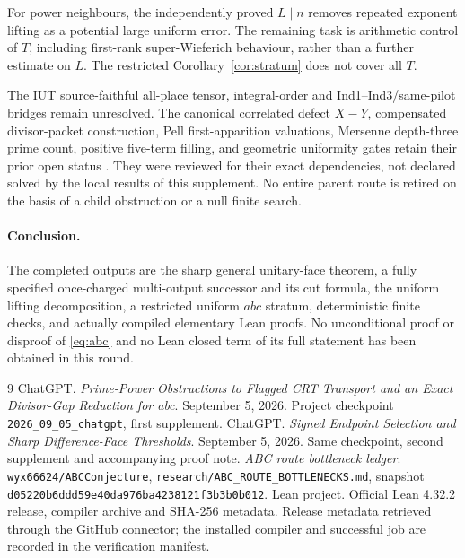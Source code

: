 \documentclass[11pt]{article}
\theoremstyle{definition}\newtheorem{definition}[theorem]{Definition}
\theoremstyle{remark}\newtheorem{remark}[theorem]{Remark}
\newcommand{\code}[1]{\texttt{\small #1}}
\begin{document}
For power neighbours, the independently proved \(L\mid n\) removes repeated exponent lifting as a potential large uniform error. The remaining task is arithmetic control of \(T\), including first-rank super-Wieferich behaviour, rather than a further estimate on \(L\). The restricted Corollary~\ref{cor:stratum} does not cover all \(T\).

The IUT source-faithful all-place tensor, integral-order and Ind1--Ind3/same-pilot bridges remain unresolved. The canonical correlated defect \(X-Y\), compensated divisor-packet construction, Pell first-apparition valuations, Mersenne depth-three prime count, positive five-term filling, and geometric uniformity gates retain their prior open status \cite{ledger}. They were reviewed for their exact dependencies, not declared solved by the local results of this supplement. No entire parent route is retired on the basis of a child obstruction or a null finite search.

\paragraph{Conclusion.}
The completed outputs are the sharp general unitary-face theorem, a fully specified once-charged multi-output successor and its cut formula, the uniform lifting decomposition, a restricted uniform \(abc\) stratum, deterministic finite checks, and actually compiled elementary Lean proofs. No unconditional proof or disproof of \eqref{eq:abc} and no Lean closed term of its full statement has been obtained in this round.

\begin{thebibliography}{9}
 ChatGPT. \emph{Prime-Power Obstructions to Flagged CRT Transport and an Exact Divisor-Gap Reduction for abc}. September 5, 2026. Project checkpoint \code{2026\_09\_05\_chatgpt}, first supplement.
 ChatGPT. \emph{Signed Endpoint Selection and Sharp Difference-Face Thresholds}. September 5, 2026. Same checkpoint, second supplement and accompanying proof note.
 \emph{ABC route bottleneck ledger}. \code{wyx66624/ABCConjecture}, \code{research/ABC\_ROUTE\_BOTTLENECKS.md}, snapshot \code{d05220b6ddd59e40da976ba4238121f3b3b0b012}.
 Lean project. Official Lean 4.32.2 release, compiler archive and SHA-256 metadata. Release metadata retrieved through the GitHub connector; the installed compiler and successful job are recorded in the verification manifest.
\end{thebibliography}
\end{document}
